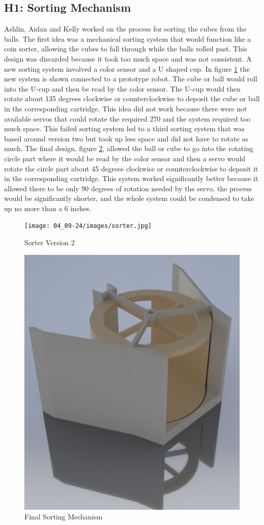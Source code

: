 \documentclass{article}
\begin{document}
\subsection{H1: Sorting Mechanism}

Ashlin, Aidan and Kelly worked on the process for sorting the cubes from the balls. The first idea was a mechanical sorting system that would function like a coin sorter, allowing the cubes to fall through while the balls rolled past. This design was discarded because it took too much space and was not consistent. A new sorting system involved a color sensor and a U shaped cup. In figure \ref{fig:Sorter Version 2} the new system is shown connected to a prototype robot. The cube or ball would roll into the U-cup and then be read by the color sensor. The U-cup would then rotate about 135 degrees clockwise or counterclockwise to deposit the cube or ball in the corresponding cartridge. This idea did not work because there were not available servos that could rotate the required 270 and the system required too much space. This failed sorting system led to a third sorting system that was based around version two but took up less space and did not have to rotate as much. The final design, figure \ref{fig:Final Sorting Mechnism}, allowed the ball or cube to go into the rotating circle part where it would be read by the color sensor and then a servo would rotate the circle part about 45 degrees clockwise or counterclockwise to deposit it in the corresponding cartridge. This system worked significantly better because it allowed there to be only 90 degrees of rotation needed by the servo, the process would be significantly shorter, and the whole system could be condensed to take up no more than a 6 inches.

\begin{figure}
    \centering
    \texttt{[image: 04\_09-24/images/sorter.jpg]}
    \caption{Sorter Version 2}
    \label{fig:Sorter Version 2}
\end{figure}

\begin{figure}
    \centering
    \includegraphics[width=.6\textwidth]{04_09-24/images/sorter2.png}
    \caption{Final Sorting Mechanism}
    \label{fig:Final Sorting Mechnism}
\end{figure}
\end{document}
